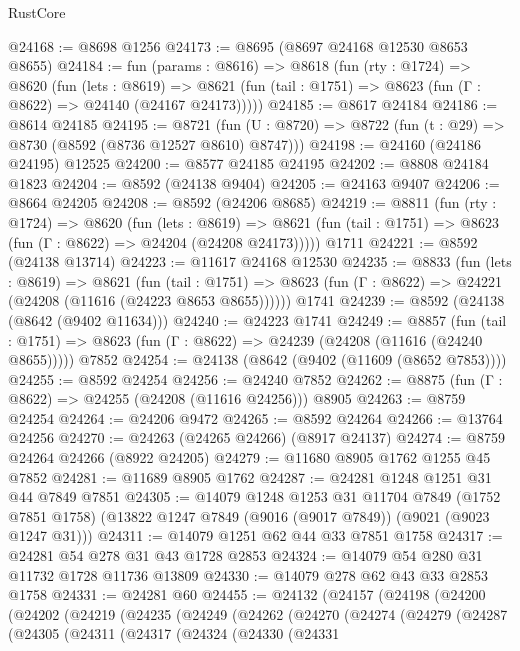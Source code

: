 \begin{lexlean}{RustCore}
\begin{coremodule}
@24168 := @8698 @1256
@24173 := @8695 (@8697 @24168 @12530 @8653 @8655)
@24184 := fun (params : @8616) =>
  @8618
    (fun (rty : @1724) =>
    @8620
      (fun (lets : @8619) =>
      @8621 (fun (tail : @1751) => @8623 (fun (Γ : @8622) => @24140 (@24167 @24173)))))
@24185 := @8617 @24184
@24186 := @8614 @24185
@24195 := @8721
    (fun (U : @8720) => @8722 (fun (t : @29) => @8730 (@8592 (@8736 @12527 @8610) @8747)))
@24198 := @24160 (@24186 @24195) @12525
@24200 := @8577 @24185 @24195
@24202 := @8808 @24184 @1823
@24204 := @8592 (@24138 @9404)
@24205 := @24163 @9407
@24206 := @8664 @24205
@24208 := @8592 (@24206 @8685)
@24219 := @8811
    (fun (rty : @1724) =>
    @8620
      (fun (lets : @8619) =>
      @8621 (fun (tail : @1751) => @8623 (fun (Γ : @8622) => @24204 (@24208 @24173)))))
    @1711
@24221 := @8592 (@24138 @13714)
@24223 := @11617 @24168 @12530
@24235 := @8833
    (fun (lets : @8619) =>
    @8621
      (fun (tail : @1751) =>
      @8623 (fun (Γ : @8622) => @24221 (@24208 (@11616 (@24223 @8653 @8655))))))
    @1741
@24239 := @8592 (@24138 (@8642 (@9402 @11634)))
@24240 := @24223 @1741
@24249 := @8857
    (fun (tail : @1751) => @8623 (fun (Γ : @8622) => @24239 (@24208 (@11616 (@24240 @8655)))))
    @7852
@24254 := @24138 (@8642 (@9402 (@11609 (@8652 @7853))))
@24255 := @8592 @24254
@24256 := @24240 @7852
@24262 := @8875 (fun (Γ : @8622) => @24255 (@24208 (@11616 @24256))) @8905
@24263 := @8759 @24254
@24264 := @24206 @9472
@24265 := @8592 @24264
@24266 := @13764 @24256
@24270 := @24263 (@24265 @24266) (@8917 @24137)
@24274 := @8759 @24264 @24266 (@8922 @24205)
@24279 := @11680 @8905 @1762 @1255 @45 @7852
@24281 := @11689 @8905 @1762
@24287 := @24281 @1248 @1251 @31 @44 @7849 @7851
@24305 := @14079
    @1248
    @1253
    @31
    @11704
    @7849
    (@1752 @7851 @1758)
    (@13822 @1247 @7849 (@9016 (@9017 @7849)) (@9021 (@9023 @1247 @31)))
@24311 := @14079 @1251 @62 @44 @33 @7851 @1758
@24317 := @24281 @54 @278 @31 @43 @1728 @2853
@24324 := @14079 @54 @280 @31 @11732 @1728 @11736 @13809
@24330 := @14079 @278 @62 @43 @33 @2853 @1758
@24331 := @24281 @60
@24455 := @24132
    (@24157
      (@24198
        (@24200
          (@24202
            (@24219
              (@24235
                (@24249
                  (@24262
                    (@24270
                      (@24274
                        (@24279
                          (@24287
                            (@24305
                              (@24311
                                (@24317
                                  (@24324
                                    (@24330
                                      (@24331

\end{coremodule}
\end{lexlean}
